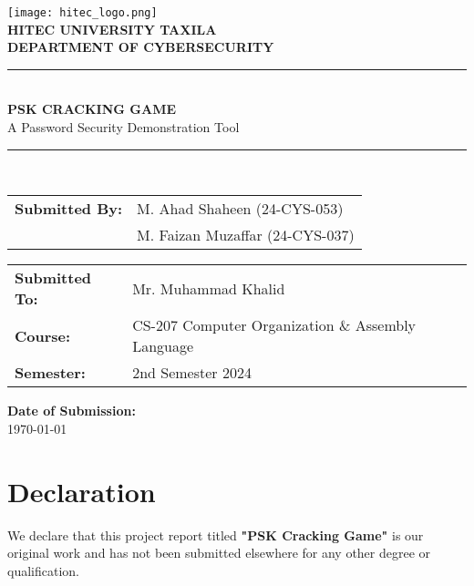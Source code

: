 \documentclass[12pt,a4paper]{report}
\begin{document}
\begin{titlepage}
    \centering
    \vspace*{1cm}
    \texttt{[image: hitec\_logo.png]}\\
    \vspace{1cm}
    {\Large \textbf{HITEC UNIVERSITY TAXILA}}\\
    \vspace{0.5cm}
    {\large \textbf{DEPARTMENT OF CYBERSECURITY}}\\
    \vspace{0.5cm}
    \rule{\textwidth}{0.5mm}\\
    \vspace{0.5cm}
    {\Huge \textbf{PSK CRACKING GAME}}\\
    \vspace{0.5cm}
    {\Large A Password Security Demonstration Tool}\\
    \vspace{0.5cm}
    \rule{\textwidth}{0.5mm}\\
    \vspace{1.5cm}
    
    \begin{tabular}{>{\bfseries}l l}
    Submitted By: & M. Ahad Shaheen (24-CYS-053)\\
    & M. Faizan Muzaffar (24-CYS-037)\\
    \end{tabular}
    \vspace{1cm}
    
    \begin{tabular}{>{\bfseries}l l}
    Submitted To: & Mr. Muhammad Khalid\\
    Course: & CS-207 Computer Organization \& Assembly Language\\
    Semester: & 2nd Semester 2024\\
    \end{tabular}
    \vspace{1cm}
    
    \textbf{Date of Submission:}\\
    \vspace{0.2cm}
    \today\\
    \vfill
\end{titlepage}

\chapter*{Declaration}
We declare that this project report titled \textbf{"PSK Cracking Game"} is our original work and has not been submitted elsewhere for any other degree or qualification.
\end{document}
